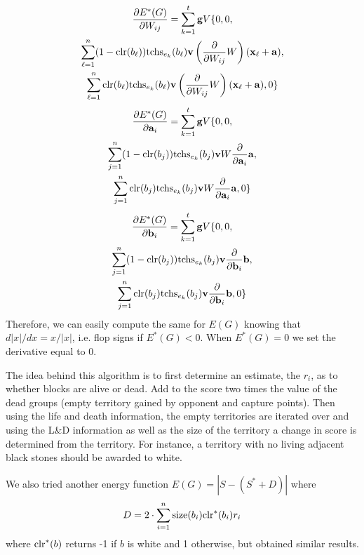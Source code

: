 \documentclass[11pt,letterpaper]{article}
\begin{document}
\begin{gather*}
\frac{ \partial E^*(G) }{ \partial W_{ i j } }  = \sum_{ k = 1 }^t \mathbf{ g } V \{ 0, 0,\\
  \sum_{ \ell = 1 }^n (1 - \mbox{clr}{\left( b_\ell \right)}) \mbox{tchs}_{ e_k }{\left( b_\ell \right)} \mathbf{ v }
  \left(\frac{ \partial }{ \partial W_{ i j } } W\right) (\mathbf{ x }_\ell + \mathbf{ a }),\\
  \sum_{ \ell = 1 }^n \mbox{clr}{\left( b_\ell \right)} \mbox{tchs}_{ e_k }{\left( b_\ell \right)} \mathbf{ v }
  \left(\frac{ \partial }{ \partial W_{ i j } } W\right) (\mathbf{ x }_\ell + \mathbf{ a }), 0 \}
\end{gather*}
\begin{gather*}
\frac{ \partial E^*(G) }{ \partial \mathbf{ a }_i } = \sum_{ k = 1 }^t \mathbf{ g } V \{ 0, 0,\\
  \sum_{ j = 1 }^n (1 - \mbox{clr}{\left( b_j \right)}) \mbox{tchs}_{ e_k }{\left( b_j \right)}
  \mathbf{ v } W \frac{ \partial }{ \partial \mathbf{ a }_i } \mathbf{ a },\\
  \sum_{ j = 1 }^n \mbox{clr}{\left( b_j \right)} \mbox{tchs}_{ e_k }{\left( b_j \right)}
  \mathbf{ v } W \frac{ \partial }{ \partial \mathbf{ a }_i } \mathbf{ a }, 0 \}
\end{gather*}
\begin{gather*}
\frac{ \partial E^*(G) }{ \partial \mathbf{ b }_i } = \sum_{ k = 1 }^t \mathbf{ g } V \{ 0, 0,\\
  \sum_{ j = 1 }^n (1 - \mbox{clr}{\left( b_j \right)}) \mbox{tchs}_{ e_k }{\left( b_j \right)}
  \mathbf{ v } \frac{ \partial }{ \partial \mathbf{ b }_i } \mathbf{ b },\\
  \sum_{ j = 1 }^n \mbox{clr}{\left( b_j \right)} \mbox{tchs}_{ e_k }{\left( b_j \right)}
  \mathbf{ v } \frac{ \partial }{ \partial \mathbf{ b }_i } \mathbf{ b }, 0 \}
\end{gather*}
Therefore, we can easily compute the same for $E(G)$ knowing that $d |x| / dx = x / |x|$, i.e. flop signs if $E^*(G) < 0$.
When $E^*(G) = 0$ we set the derivative equal to 0.

The idea behind this algorithm is to first determine an estimate, the $r_i$, as to whether blocks are alive or dead.
Add to the score two times the value of the dead groups (empty territory gained by opponent and capture points).
Then using the life and death information, the empty territories are iterated over and using the L\&D information as
well as the size of the territory a change in score is determined from the territory. For instance, a territory with no
living adjacent black stones should be awarded to white.

We also tried another energy function $E(G) = |S - (S^* + D)|$ where
$$D = 2 \cdot \sum_{ i = 1 }^n \mbox{size}{\left( b_i \right)} \mbox{clr}^*{\left( b_i \right)} r_i$$
where $\mbox{clr}^*{\left( b \right)}$ returns -1 if $b$ is white and 1 otherwise, but obtained similar results.
\end{document}
